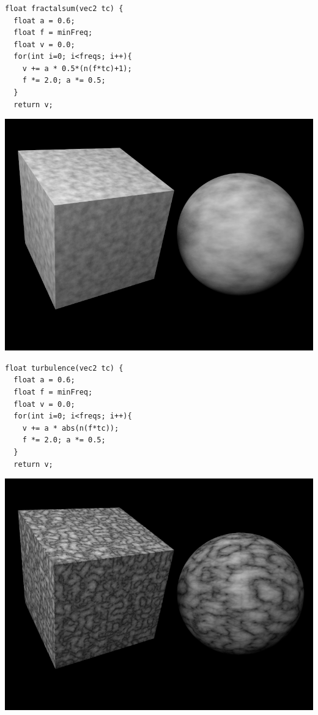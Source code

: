 \documentclass[utf8,stillsansserifmath,fleqn,t]{beamer}
\begin{document}
\begin{frame}[fragile,label=noise-3]
\frametitle{\insertsection}
\vspace*{.5ex}
\begin{minipage}{.48\textwidth}
\begin{lstlisting}
float fractalsum(vec2 tc) {
  float a = 0.6;
  float f = minFreq;
  float v = 0.0;
  for(int i=0; i<freqs; i++){
    v += a * 0.5*(n(f*tc)+1);
    f *= 2.0; a *= 0.5;
  }
  return v;
\end{lstlisting}
\vspace*{-.5ex}
\centerline{\includegraphics[width=.9\textwidth]{./fig/noise-example-gradient-fractalsum.png}}
\end{minipage}\hfill
\begin{minipage}{.48\textwidth}
\begin{lstlisting}
float turbulence(vec2 tc) {
  float a = 0.6;
  float f = minFreq;
  float v = 0.0;
  for(int i=0; i<freqs; i++){
    v += a * abs(n(f*tc));
    f *= 2.0; a *= 0.5;
  }
  return v;
\end{lstlisting}
\vspace*{-.5ex}
\centerline{\includegraphics[width=.9\textwidth]{./fig/noise-example-gradient-turbulence.png}}
\end{minipage}
\end{frame}
\end{document}
